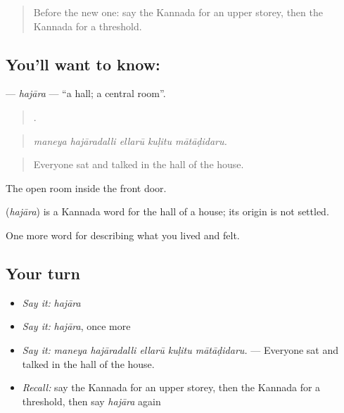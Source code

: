 \label{lesson:KA-C542-hajara}



\begin{quote}
Before the new one: say the Kannada for an upper storey, then the Kannada for a threshold.
\end{quote}

\subsection*{You'll want to know: }
\textbf{} — \emph{hajāra} — \textquotedblleft{}a hall; a central room\textquotedblright{}.

\begin{quote}
    .
\end{quote}

\begin{quote}
\emph{maneya hajāradalli ellarū kuḷitu mātāḍidaru.}
\end{quote}

\begin{quote}
Everyone sat and talked in the hall of the house.
\end{quote}

The open room inside the front door.

\begin{cousinweb}
\textbf{} (\emph{hajāra}) is a Kannada word for the hall of a house; its origin is not settled.
\end{cousinweb}

\begin{grammarlens}[title={What you've built}]
One more word for describing what you lived and felt.
\end{grammarlens}

\subsection*{Your turn}
\begin{itemize}
\raggedright
  \item \emph{Say it:} \emph{hajāra}
  \item \emph{Say it:} \emph{hajāra}, once more
  \item \emph{Say it:} \emph{maneya hajāradalli ellarū kuḷitu mātāḍidaru.} — Everyone sat and talked in the hall of the house.
  \item \emph{Recall:} say the Kannada for an upper storey, then the Kannada for a threshold, then say \emph{hajāra} again
\end{itemize}

